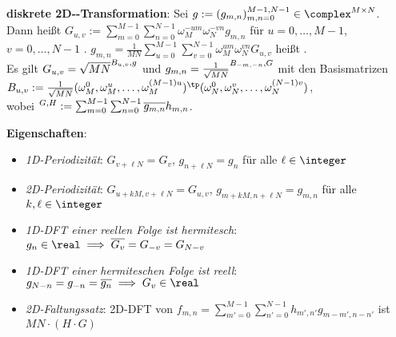 \linie

\textbf{diskrete 2D--Transformation}:
Sei $g := (g_{m,n})_{m,n=0}^{M-1,N-1} \in \complex^{M \times N}$.\\
Dann heißt
$G_{u,v} := \sum_{m=0}^{M-1} \sum_{n=0}^{N-1} \omega_M^{-um} \omega_N^{-vn} g_{m,n}$ für
$u = 0, \dotsc, M - 1$, $v = 0, \dotsc, N - 1$
.
$g_{m,n} = \frac{1}{MN} \sum_{u=0}^{M-1} \sum_{v=0}^{N-1} \omega_M^{um} \omega_N^{vn} G_{u,v}$
heißt .\\
Es gilt $G_{u,v} = \sqrt{MN} \sp{B_{u,v}, g}$
und $g_{m,n} = \frac{1}{\sqrt{MN}} \sp{B_{-m,-n}, G}$
mit den Basismatrizen\\
$B_{u,v} := \frac{1}{\sqrt{MN}} (\omega_M^0, \omega_M^u, \dotsc, \omega_M^{(M-1)u})^\tp
(\omega_N^0, \omega_N^v, \dotsc, \omega_N^{(N-1)v})$,\\
wobei $\sp{G, H} := \sum_{m=0}^{M-1} \sum_{n=0}^{N-1} \overline{g_{m,n}} h_{m,n}$.

\textbf{Eigenschaften}:
\begin{itemize}
    \item
    \vspace{-1mm}
    \emph{1D-Periodizität}:
    $G_{v+\ell N} = G_v$,
    $g_{n+\ell N} = g_n$
    für alle $\ell \in \integer$

    \item
    \vspace{-1mm}
    \emph{2D-Periodizität}:
    $G_{u+kM,v+\ell N} = G_{u,v}$,
    $g_{m+kM,n+\ell N} = g_{m,n}$
    für alle $k, \ell \in \integer$

    \item
    \vspace{-1mm}
    \emph{1D-DFT einer reellen Folge ist hermitesch}:
    $g_n \in \real \implies \overline{G_v} = G_{-v} = G_{N-v}$

    \item
    \vspace{-1mm}
    \emph{1D-DFT einer hermiteschen Folge ist reell}:
    $g_{N-n} = g_{-n} = \overline{g_n} \implies G_v \in \real$

    \item
    \vspace{-1mm}
    \emph{2D-Faltungssatz}:
    2D-DFT von $f_{m,n} = \sum_{m'=0}^{M-1} \sum_{n'=0}^{N-1} h_{m',n'} g_{m-m',n-n'}$
    ist $MN \cdot (H \cdot G)$
\end{itemize}

\pagebreak
